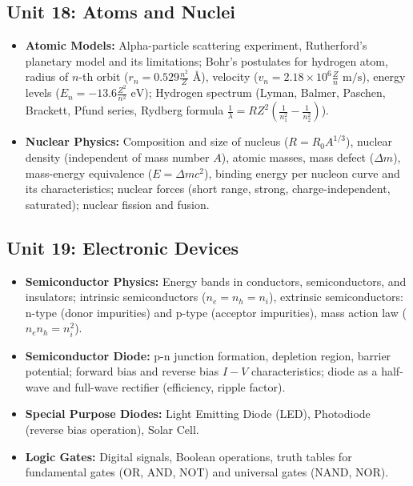 \documentclass[11pt,a4paper]{article}
\begin{document}
\subsection{Unit 18: Atoms and Nuclei}
\begin{itemize}
  \item \textbf{Atomic Models:} Alpha-particle scattering experiment, Rutherford's planetary model and its limitations; Bohr's postulates for hydrogen atom, radius of $n$-th orbit ($r_n = 0.529 \frac{n^2}{Z}\text{ \AA}$), velocity ($v_n = 2.18\times 10^6 \frac{Z}{n}\text{ m/s}$), energy levels ($E_n = -13.6 \frac{Z^2}{n^2}\text{ eV}$); Hydrogen spectrum (Lyman, Balmer, Paschen, Brackett, Pfund series, Rydberg formula $\frac{1}{\lambda} = R Z^2(\frac{1}{n_1^2} - \frac{1}{n_2^2})$).
  \item \textbf{Nuclear Physics:} Composition and size of nucleus ($R = R_0 A^{1/3}$), nuclear density (independent of mass number $A$), atomic masses, mass defect ($\Delta m$), mass-energy equivalence ($E = \Delta m c^2$), binding energy per nucleon curve and its characteristics; nuclear forces (short range, strong, charge-independent, saturated); nuclear fission and fusion.
\end{itemize}

\subsection{Unit 19: Electronic Devices}
\begin{itemize}
  \item \textbf{Semiconductor Physics:} Energy bands in conductors, semiconductors, and insulators; intrinsic semiconductors ($n_e = n_h = n_i$), extrinsic semiconductors: n-type (donor impurities) and p-type (acceptor impurities), mass action law ($n_e n_h = n_i^2$).
  \item \textbf{Semiconductor Diode:} p-n junction formation, depletion region, barrier potential; forward bias and reverse bias $I-V$ characteristics; diode as a half-wave and full-wave rectifier (efficiency, ripple factor).
  \item \textbf{Special Purpose Diodes:} Light Emitting Diode (LED), Photodiode (reverse bias operation), Solar Cell.
  \item \textbf{Logic Gates:} Digital signals, Boolean operations, truth tables for fundamental gates (OR, AND, NOT) and universal gates (NAND, NOR).
\end{itemize}
\end{document}
